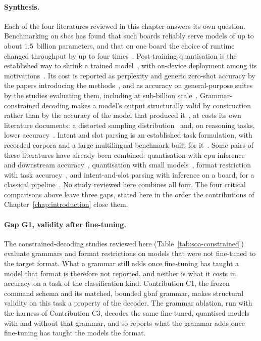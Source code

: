 \paragraph{Synthesis.} Each of the four literatures reviewed in this chapter answers its own
question. Benchmarking on \glspl{sbc} has found that such boards reliably serve models of up to
about 1.5~billion parameters, and that on one board the choice of runtime changed throughput by up
to four times~\cite{sbc2025}. Post-training quantisation is the established way to shrink a trained
model~\cite{gptq}, with on-device deployment among its motivations~\cite{awq}. Its cost is
reported as perplexity and generic zero-shot accuracy by the papers introducing the methods~\cite{spqr,gptq}, and as accuracy on general-purpose suites by
the studies evaluating them, including at sub-billion scale~\cite{kurtic2025,kurt2026,slmquant}.
Grammar-constrained decoding makes a model's output structurally valid by construction rather than
by the accuracy of the model that produced it~\cite{willard2023,koo2024}, at costs its own
literature documents: a distorted sampling distribution~\cite{park2024} and, on reasoning tasks,
lower accuracy~\cite{tam2024}. Intent and slot parsing
is an established task formulation, with recorded corpora and a large multilingual benchmark
built for it~\cite{slurp2020,massive}. Some pairs of these literatures have already been combined: quantisation with
\gls{cpu} inference and downstream accuracy~\cite{kurt2026}, quantisation with small
models~\cite{slmquant}, format restriction with task accuracy~\cite{tam2024}, and intent-and-slot
parsing with inference on a board, for a classical pipeline~\cite{snips2018}. No study reviewed
here combines all four. The four critical comparisons above leave three gaps, stated
here in the order the contributions of Chapter~\ref{chap:introduction} close them.

\paragraph{Gap G1, validity after fine-tuning.} The constrained-decoding studies reviewed here
(Table~\ref{tab:soa-constrained}) evaluate grammars and format restrictions on models that were
not fine-tuned to the target format. What a grammar still adds once fine-tuning has taught a model
that format is therefore not reported, and neither is what it costs in accuracy on a task of the
classification kind. Contribution C1, the frozen command schema and its
matched, bounded \gls{gbnf} grammar, makes structural validity on this task a property of the
decoder. The grammar ablation, run with the harness of Contribution C3, decodes the same
fine-tuned, quantised models with and without that grammar, and so reports what the grammar adds
once fine-tuning has taught the models the format.


